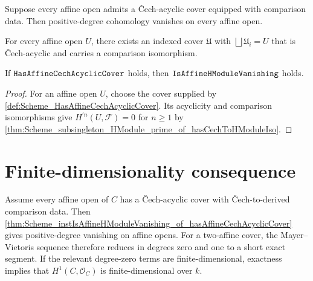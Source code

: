 Suppose every affine open admits a \v{C}ech-acyclic cover equipped with comparison data. Then positive-degree cohomology vanishes on every affine open.

\begin{definition}\leanok
  \label{def:Scheme_HasAffineCechAcyclicCover}

  For every affine open \(U\), there exists an indexed cover \(\mathfrak U\) with \(\bigsqcup \mathfrak U_i = U\) that is Čech-acyclic and carries a comparison isomorphism.
\end{definition}

\begin{theorem}\leanok
  \label{thm:Scheme_instIsAffineHModuleVanishing_of_hasAffineCechAcyclicCover}

  If \(\mathtt{HasAffineCechAcyclicCover}\) holds, then \(\mathtt{IsAffineHModuleVanishing}\) holds.
\end{theorem}

\begin{proof}


\leanok
  For an affine open \(U\), choose the cover supplied by \cref{def:Scheme_HasAffineCechAcyclicCover}. Its acyclicity and comparison isomorphisms give \(H^{\prime n}(U,\mathcal F)=0\) for \(n\geq1\) by \cref{thm:Scheme_subsingleton_HModule_prime_of_hasCechToHModuleIso}.
\end{proof}

\section{Finite-dimensionality consequence}
\label{sec:mv_use_in_project}

Assume every affine open of \(C\) has a \v{C}ech-acyclic cover with \v{C}ech-to-derived comparison data. Then \cref{thm:Scheme_instIsAffineHModuleVanishing_of_hasAffineCechAcyclicCover} gives positive-degree vanishing on affine opens. For a two-affine cover, the Mayer--Vietoris sequence therefore reduces in degrees zero and one to a short exact segment. If the relevant degree-zero terms are finite-dimensional, exactness implies that \(H^1(C,\mathcal O_C)\) is finite-dimensional over \(k\).

